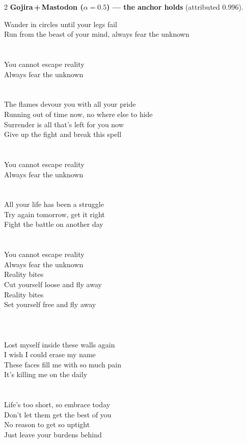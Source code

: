 \begin{multicols}{2}
\nopagebreak\noindent\textbf{Gojira\,+\,Mastodon ($\alpha{=}0.5$) --- the anchor holds} (attributed 0.996).\par\nopagebreak\vspace{4pt}
{\footnotesize\itshape\raggedright
Wander in circles until your legs fail \\
Run from the beast of your mind, always fear the unknown \\
\mbox{} \\
\mbox{} \\
You cannot escape reality \\
Always fear the unknown \\
\mbox{} \\
\mbox{} \\
The flames devour you with all your pride \\
Running out of time now, no where else to hide \\
Surrender is all that's left for you now \\
Give up the fight and break this spell \\
\mbox{} \\
\mbox{} \\
You cannot escape reality \\
Always fear the unknown \\
\mbox{} \\
\mbox{} \\
All your life has been a struggle \\
Try again tomorrow, get it right \\
Fight the battle on another day \\
\mbox{} \\
\mbox{} \\
You cannot escape reality \\
Always fear the unknown \\
Reality bites \\
Cut yourself loose and fly away \\
Reality bites \\
Set yourself free and fly away \\
\mbox{} \\
\mbox{} \\
\mbox{} \\
Lost myself inside these walls again \\
I wish I could erase my name \\
These faces fill me with so much pain \\
It's killing me on the daily \\
\mbox{} \\
\mbox{} \\
Life's too short, so embrace today \\
Don't let them get the best of you \\
No reason to get so uptight \\
Just leave your burdens behind\par}
\medskip

\end{multicols}

